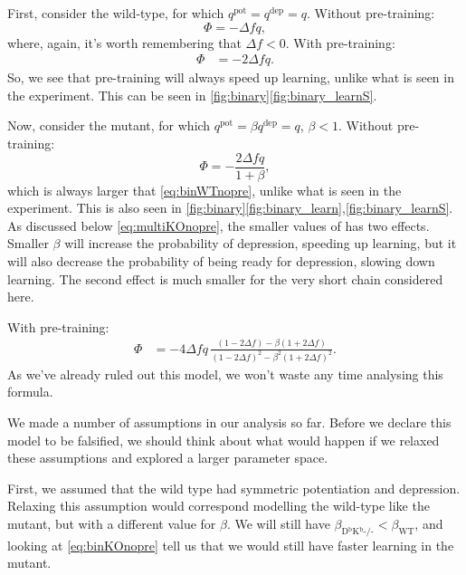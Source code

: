 \documentclass[12pt]{article}
\newcommand{\pot}{^{\text{pot}}}
\newcommand{\dep}{^{\text{dep}}}
\newcommand{\wt}{_{\text{WT}}}
\newcommand{\ko}{_{\text{D$^\mathrm{b}$K$^\mathrm{b}$-/-}}}
\begin{document}
First, consider the wild-type, for which $q\pot=q\dep=q$.
Without pre-training:
%
\begin{equation}\label{eq:binWTnopre}
  \Phi = -\Delta f q,
\end{equation}
%
where, again, it's worth remembering that $\Delta f<0$.
With pre-training:
%
\begin{equation}\label{eq:binWTpre}
\begin{aligned}
  \Phi &= -2\Delta f q.
\end{aligned}
\end{equation}
%
So, we see that pre-training will always speed up learning, unlike what is seen in the experiment.
This can be seen in \autoref{fig:binary}\ref{fig:binary_learnS}.

Now, consider the mutant, for which $q\pot=\beta q\dep=q$, $\beta<1$.
Without pre-training:
%
\begin{equation}\label{eq:binKOnopre}
  \Phi = -\frac{2\Delta f q}{1+\beta},
\end{equation}
%
which is always larger that \eqref{eq:binWTnopre}, unlike what is seen in the experiment.
This is also seen in \autoref{fig:binary}\ref{fig:binary_learn},\ref{fig:binary_learnS}.
As discussed below \eqref{eq:multiKOnopre}, the smaller values of has two effects.
Smaller $\beta$ will increase the probability of depression, speeding up learning, but it will also decrease the probability of being ready for depression, slowing down learning.
The second effect is much smaller for the very short chain considered here.

With pre-training:
%
\begin{equation}\label{eq:binKOpre}
\begin{aligned}
  \Phi &= -4\Delta f q \, \frac{(1-2\Delta f) - \beta(1+2\Delta f)}
          {(1-2\Delta f)^2 - \beta^2(1+2\Delta f)^2}.
\end{aligned}
\end{equation}
%
As we've already ruled out this model, we won't waste any time analysing this formula.

We made a number of assumptions in our analysis so far.
Before we declare this model to be falsified, we should think about what would happen if we relaxed these assumptions and explored a larger parameter space.

First, we assumed that the wild type had symmetric potentiation and depression.
Relaxing this assumption would correspond modelling the wild-type like the mutant, but with a different value for $\beta$.
We will still have $\beta\ko<\beta\wt$, and looking at \eqref{eq:binKOnopre} tell us that we would still have faster learning in the mutant.
\end{document}
